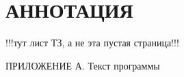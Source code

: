 

\newpage
\section*{АННОТАЦИЯ}


\newpage
!!!тут лист ТЗ, а не эта пустая страница!!!

\newpage
{}
\begingroup
\textbf{
\tableofcontents
}
\noindent ПРИЛОЖЕНИЕ А. Текст программы

